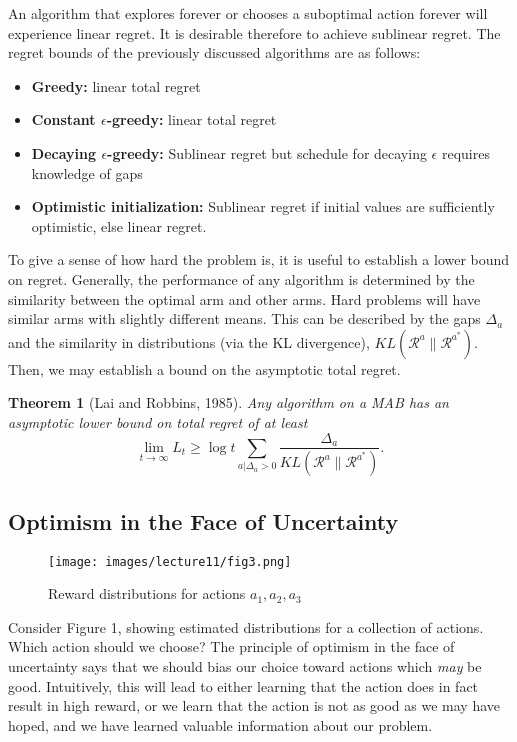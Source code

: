 \documentclass{article}
\newtheorem{theorem}{Theorem}
\begin{document}
An algorithm that explores forever or chooses a suboptimal action forever will experience linear regret. It is desirable therefore to achieve sublinear regret. The regret bounds of the previously discussed algorithms are as follows:
\begin{itemize}
    \item \textbf{Greedy:} linear total regret
    \item \textbf{Constant $\epsilon$-greedy:} linear total regret
    \item \textbf{Decaying $\epsilon$-greedy:} Sublinear regret but schedule for decaying $\epsilon$ requires knowledge of gaps
    \item \textbf{Optimistic initialization:} Sublinear regret if initial values are sufficiently optimistic, else linear regret.
\end{itemize}

To give a sense of how hard the problem is, it is useful to establish a lower bound on regret. Generally, the performance of any algorithm is determined by the similarity between the optimal arm and other arms. Hard problems will have similar arms with slightly different means. This can be described by the gaps $\Delta_a$ and the similarity in distributions (via the KL divergence), $KL(\mathcal{R}^a\|\mathcal{R}^{a^*})$. Then, we may establish a bound on the asymptotic total regret.

\begin{theorem}[Lai and Robbins, 1985]
Any algorithm on a MAB has an asymptotic lower bound on total regret of at least
\begin{equation*}
    \lim_{t \to \infty} L_t \geq \log t \sum_{a|\Delta_a >0}\frac{\Delta_a}{KL(\mathcal{R}^a\|\mathcal{R}^{a^*})}.
\end{equation*}
\end{theorem}

\subsection{Optimism in the Face of Uncertainty}
\begin{figure}[H]
    \centering
    \texttt{[image: images/lecture11/fig3.png]}
    \caption{Reward distributions for actions $a_1,a_2,a_3$}
    \label{fig:actions}
\end{figure}

Consider Figure 1, showing estimated distributions for a collection of actions. Which action should we choose? The principle of optimism in the face of uncertainty says that we should bias our choice toward actions which \textit{may} be good. Intuitively, this will lead to either learning that the action does in fact result in high reward, or we learn that the action is not as good as we may have hoped, and we have learned valuable information about our problem.
\end{document}
